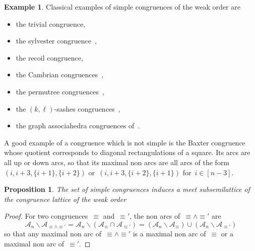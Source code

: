 \documentclass{amsart}
\newtheorem{proposition}[theorem]{Proposition}
\theoremstyle{definition}
\newtheorem{example}[theorem]{Example}
\newtheorem{remark}[theorem]{Remark}
\newcommand{\ssm}{\smallsetminus} %
\newcommand{\eqdef}{\mbox{\,\raisebox{0.2ex}{\scriptsize\ensuremath{\mathrm:}}\ensuremath{=}\,}} %
\newcommand{\darkblue}{\color{darkblue}} %
\newcommand{\defn}[1]{\textsl{\darkblue #1}} %
\newcommand{\arc}{\alpha} %
\newcommand{\arcs}{{\mathcal{A}}} %
\newcommand{\nonarcs}{{\mathcal{B}}} %
\newcommand{\meet}{\wedge} %
\begin{document}

\begin{example}
Classical examples of simple congruences of the weak order are
\begin{itemize}
\item the trivial congruence,
\item the sylvester congruence~\cite{Tonks, HivertNovelliThibon-algebraBinarySearchTrees},
\item the recoil congruence,
\item the Cambrian congruences~\cite{Reading-CambrianLattices, ChatelPilaud},
\item the permutree congruences~\cite{PilaudPons-permutrees},
\item the $(k,\ell)$-sashes congruences~\cite{LaniniNovelli},
\item the graph associahedra congruences of~\cite{BarnardMcConville}.
\end{itemize}
A good example of a congruence which is not simple is the Baxter congruence~\cite{LawReading, Giraudo} whose quotient corresponds to diagonal rectangulations of a square. Its arcs are all up or down arcs, so that its maximal non arcs are all arcs of the form~$(i, i+3, \{i+1\}, \{i+2\})$ or~$(i, i+3, \{i+2\}, \{i+1\})$ for~$i \in [n-3]$.
\end{example}

\begin{proposition}
\label{prop:simpleCongruenceMeetSemilattice}
The set of simple congruences induces a meet subsemilattice of the congruence lattice of the weak order
\end{proposition}

\begin{proof}
For two congruences~$\equiv$ and~$\equiv'$, the non arcs of~${\equiv} \meet {\equiv'}$ are
\[
\arcs_n \ssm \arcs_{{\equiv} \meet {\equiv'}} = \arcs_n \ssm (\arcs_{\equiv} \cap \arcs_{\equiv'}) = (\arcs_n \ssm \arcs_{\equiv}) \cup (\arcs_n \ssm \arcs_{\equiv'})
\]
so that any maximal non arc of~${\equiv} \meet {\equiv'}$ is a maximal non arc of~${\equiv}$ or a maximal non arc of~${\equiv'}$.
\end{proof}
\end{document}
